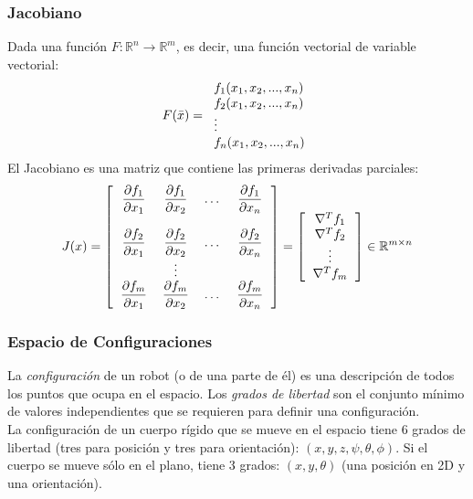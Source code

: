 \begin{frame}\frametitle{Jacobiano}
  Dada una función $F:\mathbb{R}^n \rightarrow \mathbb{R}^m$, es decir, una función vectorial de variable vectorial:
  \[F(\bar{x}) = \begin{tabular}{l}$f_1(x_1, x_2, ..., x_n)$\\$f_2(x_1, x_2, ..., x_n)$\\ $\vdots$ \\ $f_n(x_1, x_2, ..., x_n)$\end{tabular}\]
  El Jacobiano es una matriz que contiene las primeras derivadas parciales:
  \[J(x) = \left[\begin{tabular}{cccc}
      $\dfrac{\partial f_1}{\partial x_1}$ & $\dfrac{\partial f_1}{\partial x_2}$ & $\dots$ & $\dfrac{\partial f_1}{\partial x_n}$\\
      & & &\\
      $\dfrac{\partial f_2}{\partial x_1}$ & $\dfrac{\partial f_2}{\partial x_2}$ & $\dots$ & $\dfrac{\partial f_2}{\partial x_n}$\\
      & $\vdots$ & & \\
      $\dfrac{\partial f_m}{\partial x_1}$ & $\dfrac{\partial f_m}{\partial x_2}$ & $\dots$ & $\dfrac{\partial f_m}{\partial x_n}$\\
    \end{tabular}\right] = \left[\begin{tabular}{c}$\nabla^T f_1$\\ $\nabla^T f_2$ \\ $\vdots$ \\ $\nabla^T f_m$\end{tabular}\right]\in\mathbb{R}^{m\times n}\]
\end{frame}

\begin{frame}\frametitle{Espacio de Configuraciones}
  La \textit{configuración} de un robot (o de una parte de él) es una descripción de todos los puntos que ocupa en el espacio. Los \textit{grados de libertad} son el conjunto mínimo de valores independientes que se requieren para definir una configuración.
  \[\]
  La configuración de un cuerpo rígido que se mueve en el espacio tiene 6 grados de libertad (tres para posición y tres para orientación): $(x,y,z,\psi,\theta,\phi)$. Si el cuerpo se mueve sólo en el plano, tiene 3 grados: $(x,y,\theta)$ (una posición en 2D y una orientación).
\end{frame}

